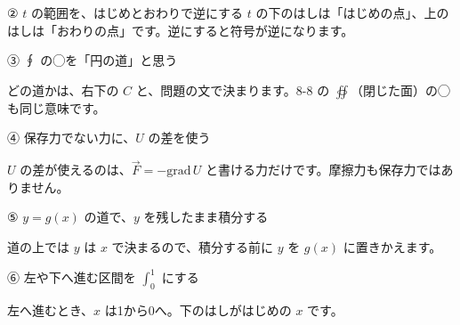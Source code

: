 \begin{tsumazuki}{② $t$ の範囲を、はじめとおわりで逆にする}
$t$ の下のはしは「はじめの点」、上のはしは「おわりの点」です。逆にすると符号が逆になります。
\end{tsumazuki}



\begingroup{}%
\noindent\begin{minipage}[t]{0.485\linewidth}\vspace{0pt}
\begin{tsumazuki}{③ ∮ の◯を「円の道」と思う}
\raggedright{}
どの道かは、右下の $C$ と、問題の文で決まります。8-8 の $\oiint$（閉じた面）の◯も同じ意味です。
\end{tsumazuki}
\end{minipage}\hfill
\begin{minipage}[t]{0.485\linewidth}\vspace{0pt}
\begin{tsumazuki}{④ 保存力でない力に、$U$ の差を使う}
\raggedright{}
$U$ の差が使えるのは、$\vec F=-\mathrm{grad}\,U$ と書ける力だけです。摩擦力も保存力ではありません。
\end{tsumazuki}
\end{minipage}\par
\endgroup

\begingroup{}%
\noindent\begin{minipage}[t]{0.485\linewidth}\vspace{0pt}
\begin{tsumazuki}{⑤ $y=g(x)$ の道で、$y$ を残したまま積分する}
\raggedright{}
道の上では $y$ は $x$ で決まるので、積分する前に $y$ を $g(x)$ に置きかえます。
\end{tsumazuki}
\end{minipage}\hfill
\begin{minipage}[t]{0.485\linewidth}\vspace{0pt}
\begin{tsumazuki}{⑥ 左や下へ進む区間を $\int_0^1$ にする}
\raggedright{}
左へ進むとき、$x$ は1から0へ。下のはしがはじめの $x$ です。
\end{tsumazuki}
\end{minipage}\par
\endgroup





